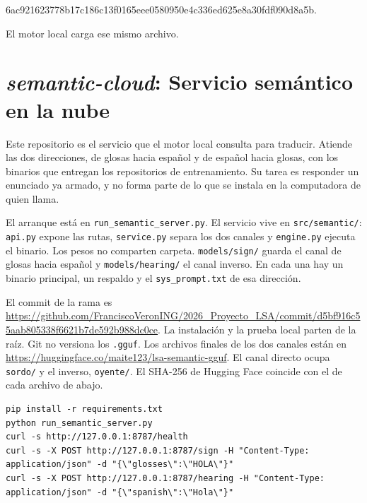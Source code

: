 {\ttfamily\small 6ac921623778b17c186c13f0165eee05\allowbreak 80950e4c336ed625e8a30fdf090d8a5b}.

El motor local carga ese mismo archivo.

\section{\textit{semantic-cloud}: Servicio semántico en la nube}
Este repositorio es el servicio que el motor local consulta para traducir. Atiende las dos direcciones, de glosas hacia español y de español hacia glosas, con los binarios que entregan los repositorios de entrenamiento. Su tarea es responder un enunciado ya armado, y no forma parte de lo que se instala en la computadora de quien llama.

El arranque está en \texttt{run\_semantic\_server.py}. El servicio vive en \texttt{src/semantic/}: \texttt{api.py} expone las rutas, \texttt{service.py} separa los dos canales y \texttt{engine.py} ejecuta el binario. Los pesos no comparten carpeta. \texttt{models/sign/} guarda el canal de glosas hacia español y \texttt{models/hearing/} el canal inverso. En cada una hay un binario principal, un respaldo y el \texttt{sys\_prompt.txt} de esa dirección.

El commit de la rama es \url{https://github.com/FranciscoVeronING/2026_Proyecto_LSA/commit/d5bf916c55aab805338f6621b7de592b988dc0ce}. La instalación y la prueba local parten de la raíz. Git no versiona los \texttt{.gguf}. Los archivos finales de los dos canales están en \url{https://huggingface.co/maite123/lsa-semantic-gguf}. El canal directo ocupa \texttt{sordo/} y el inverso, \texttt{oyente/}. El SHA-256 de Hugging Face coincide con el de cada archivo de abajo.

\begin{lstlisting}
pip install -r requirements.txt
python run_semantic_server.py
curl -s http://127.0.0.1:8787/health
curl -s -X POST http://127.0.0.1:8787/sign -H "Content-Type: application/json" -d "{\"glosses\":\"HOLA\"}"
curl -s -X POST http://127.0.0.1:8787/hearing -H "Content-Type: application/json" -d "{\"spanish\":\"Hola\"}"
\end{lstlisting}

